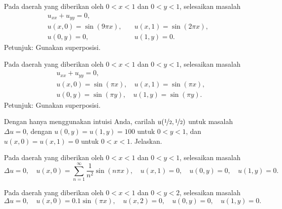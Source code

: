 \begin{exercise}
Pada daerah yang diberikan oleh $0 < x < 1$ dan $0 < y < 1$,
selesaikan masalah
\begin{equation*}
\begin{array}{ll}
u_{xx} + u_{yy} = 0, & \\
u(x,0) = \sin (9 \pi x), \quad & u(x,1) = \sin (2 \pi x), \\
u(0,y) = 0, \quad & u(1,y) = 0 .
\end{array}
\end{equation*}
Petunjuk: Gunakan superposisi.
\end{exercise}

\begin{exercise}
Pada daerah yang diberikan oleh $0 < x < 1$ dan $0 < y < 1$,
selesaikan masalah
\begin{align*}
& u_{xx} + u_{yy} = 0, \\
& u(x,0) = \sin (\pi x), \quad u(x,1) = \sin (\pi x), \\
& u(0,y) = \sin (\pi y), \quad u(1,y) = \sin (\pi y) .
\end{align*}
Petunjuk: Gunakan superposisi.
\end{exercise}

\begin{exercise}[menantang]
Dengan hanya menggunakan intuisi Anda, carilah $u(\nicefrac{1}{2},\nicefrac{1}{2})$
untuk masalah
$\Delta u = 0$, dengan $u(0,y) = u(1,y) = 100$ untuk $0 < y < 1$, dan
$u(x,0) = u(x,1) = 0$ untuk $0 < x < 1$.  Jelaskan.
\end{exercise}

\setcounter{exercise}{100}

\begin{exercise}
Pada daerah yang diberikan oleh $0 < x < 1$ dan $0 < y < 1$,
selesaikan masalah
\begin{equation*}
\Delta u = 0, \quad u(x,0) = \sum_{n=1}^\infty \frac{1}{n^2} \sin (n \pi x),
\quad u(x,1) = 0,
\quad u(0,y) = 0, 
\quad u(1,y) = 0 .
\end{equation*}
\end{exercise}

\begin{exercise}
Pada daerah yang diberikan oleh $0 < x < 1$ dan $0 < y < 2$,
selesaikan masalah
\begin{equation*}
\Delta u = 0, \quad u(x,0) = 0.1 \sin (\pi x),
\quad u(x,2) = 0,
\quad u(0,y) = 0, 
\quad u(1,y) = 0 .
\end{equation*}
\end{exercise}

